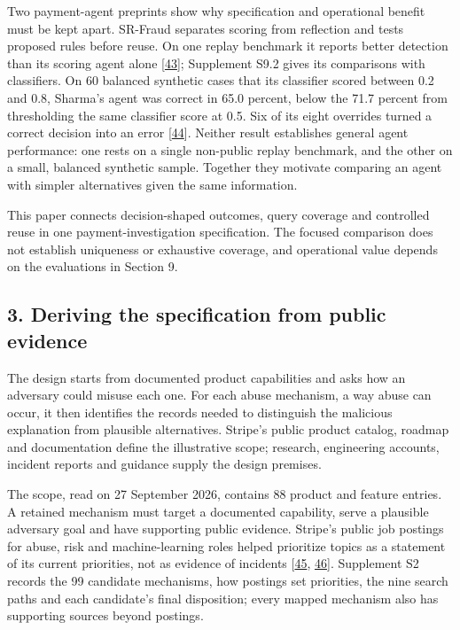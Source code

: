 \documentclass[
  11pt,
]{article}
\begin{document}
Two payment-agent preprints show why specification and operational
benefit must be kept apart. SR-Fraud separates scoring from reflection
and tests proposed rules before reuse. On one replay benchmark it
reports better detection than its scoring agent alone
{[}\protect\hyperlink{ref-Tan2026SRFraud}{43}{]}; Supplement S9.2 gives
its comparisons with classifiers. On 60 balanced synthetic cases that
its classifier scored between 0.2 and 0.8, Sharma's agent was correct in
65.0 percent, below the 71.7 percent from thresholding the same
classifier score at 0.5. Six of its eight overrides turned a correct
decision into an error
{[}\protect\hyperlink{ref-Sharma2026AuditableFraud}{44}{]}. Neither
result establishes general agent performance: one rests on a single
non-public replay benchmark, and the other on a small, balanced
synthetic sample. Together they motivate comparing an agent with simpler
alternatives given the same information.

This paper connects decision-shaped outcomes, query coverage and
controlled reuse in one payment-investigation specification. The focused
comparison does not establish uniqueness or exhaustive coverage, and
operational value depends on the evaluations in Section 9.

\FloatBarrier

\hypertarget{deriving-the-specification-from-public-evidence}{%
\subsection{3. Deriving the specification from public
evidence}\label{deriving-the-specification-from-public-evidence}}

\suppressfloats[t]

The design starts from documented product capabilities and asks how an
adversary could misuse each one. For each abuse mechanism, a way abuse
can occur, it then identifies the records needed to distinguish the
malicious explanation from plausible alternatives. Stripe's public
product catalog, roadmap and documentation define the illustrative
scope; research, engineering accounts, incident reports and guidance
supply the design premises.

The scope, read on 27 September 2026, contains 88 product and feature
entries. A retained mechanism must target a documented capability, serve
a plausible adversary goal and have supporting public evidence. Stripe's
public job postings for abuse, risk and machine-learning roles helped
prioritize topics as a statement of its current priorities, not as
evidence of incidents {[}\protect\hyperlink{ref-Stripe2026}{45},
\protect\hyperlink{ref-StripeARE2026}{46}{]}. Supplement S2 records the
99 candidate mechanisms, how postings set priorities, the nine search
paths and each candidate's final disposition; every mapped mechanism
also has supporting sources beyond postings.
\end{document}
